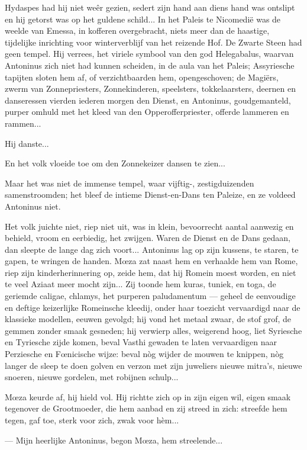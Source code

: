 \documentclass[a4paper, 12pt, oneside, dutch]{article}
\begin{document}
Hydaspes had hij niet weêr gezien, sedert zijn hand aan diens hand was ontslipt en hij getorst was op het guldene schild... In het Paleis te Nicomedië was de weelde van Emessa, in kofferen overgebracht, niets meer dan de haastige, tijdelijke inrichting voor winterverblijf van het reizende Hof. De Zwarte Steen had geen tempel. Hij verrees, het viriele symbool van den god Helegabalus, waarvan Antoninus zich niet had kunnen scheiden, in de aula van het Paleis; Assyriesche tapijten sloten hem af, of verzichtbaarden hem, opengeschoven; de Magiërs, zwerm van Zonnepriesters, Zonnekinderen, speelsters, tokkelaarsters, deernen en danseressen vierden iederen morgen den Dienst, en Antoninus, goudgemanteld, purper omhuld met het kleed van den Opperofferpriester, offerde lammeren en rammen...

Hij danste...

En het volk vloeide toe om den Zonnekeizer dansen te zien...

Maar het was niet de immense tempel, waar vijftig-, zestigduizenden samenstroomden; het bleef de intieme Dienst-en-Dans ten Paleize, en ze voldeed Antoninus niet.

Het volk juichte niet, riep niet uit, was in klein, bevoorrecht aantal aanwezig en behield, vroom en eerbiedig, het zwijgen. Waren de Dienst en de Dans gedaan, dan sleepte de lange dag zich voort... Antoninus lag op zijn kussens, te staren, te gapen, te wringen de handen. Mœza zat naast hem en verhaalde hem van Rome, riep zijn kinderherinnering op, zeide hem, dat hij Romein moest worden, en niet te veel Aziaat meer mocht zijn... Zij toonde hem kuras, tuniek, en toga, de geriemde caligae, chlamys, het purperen paludamentum --- geheel de eenvoudige en deftige keizerlijke Romeinsche kleedij, onder haar toezicht vervaardigd naar de klassieke modellen, eeuwen gevolgd; hij vond het metaal zwaar, de stof grof, de gemmen zonder smaak gesneden; hij verwierp alles, weigerend hoog, liet Syriesche en Tyriesche zijde komen, beval Vasthi gewaden te laten vervaardigen naar Perziesche en Fœnicische wijze: beval nòg wijder de mouwen te knippen, nòg langer de sleep te doen golven en verzon met zijn juweliers nieuwe mitra's, nieuwe snoeren, nieuwe gordelen, met robijnen schulp...

Mœza keurde af, hij hield vol. Hij richtte zich op in zijn eigen wil, eigen smaak tegenover de Grootmoeder, die hem aanbad en zij streed in zich: streefde hem tegen, gaf toe, sterk voor zich, zwak voor hèm...

--- Mijn heerlijke Antoninus, begon Mœza, hem streelende...
\end{document}
